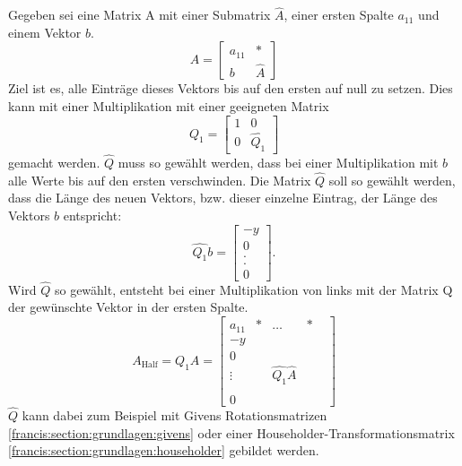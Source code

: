 Gegeben sei eine Matrix A mit einer Submatrix $\hat{A}$, einer ersten Spalte $a_{11}$ und einem Vektor $b$.
\begin{equation}
A=
\begin{bmatrix}
a_{11} & *\\
b & \hat{A}
\end{bmatrix}
\end{equation}
Ziel ist es, alle Einträge dieses Vektors bis auf den ersten auf null zu setzen.
Dies kann mit einer Multiplikation mit einer geeigneten Matrix
\begin{equation}
Q_{1}=
\begin{bmatrix}
	1 & 0\\
	0 & \hat{Q_1}
\end{bmatrix}
\end{equation}
gemacht werden.
$\hat{Q}$ muss so gewählt werden, dass bei einer Multiplikation mit $b$ alle Werte bis auf den ersten verschwinden.
Die Matrix $\hat{Q}$ soll so gewählt werden, dass die Länge des neuen Vektors, bzw. dieser einzelne Eintrag, der Länge des Vektors $b$ entspricht:
\begin{equation}
\hat{Q_1}b=
\begin{bmatrix}
-y\\
0\\
.\\
.\\
0
\end{bmatrix}.
\end{equation}
Wird $\hat{Q}$ so gewählt, entsteht bei einer Multiplikation von links mit der Matrix Q der gewünschte Vektor in der ersten Spalte.
\begin{equation}
A_{\text{Half}}=Q_{1}A=
\begin{bmatrix}
a_{11} & * & \dots & *\\
-y & \\
0 & & & &\\
\vdots & &\hat{Q_1}\hat{A} & &\\
 & & & &\\
0 & & & &
\end{bmatrix}
\end{equation}
$\hat{Q}$ kann dabei zum Beispiel mit Givens Rotationsmatrizen \ref{francis:section:grundlagen:givens} oder einer Householder-Transformationsmatrix \ref{francis:section:grundlagen:householder} gebildet werden.

